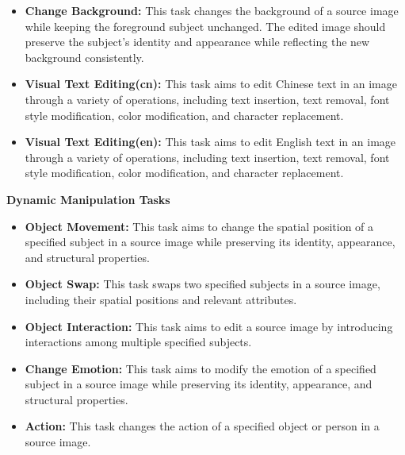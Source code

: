 \documentclass{llmxive}
\begin{document}
\begin{itemize}[leftmargin=2.2em, labelsep=0.4em, itemsep=2pt]
    \item \textbf{Change Background: } This task changes the background of a source image while keeping the foreground subject unchanged. The edited image should preserve the subject’s identity and appearance while reflecting the new background consistently.
    \item \textbf{Visual Text Editing(cn):}  This task aims to edit Chinese text in an image through a variety of operations, including text insertion, text removal, font style modification, color modification, and character replacement.
    \item \textbf{Visual Text Editing(en): } This task aims to edit English text in an image through a variety of operations, including text insertion, text removal, font style modification, color modification, and character replacement.
\end{itemize}

\textbf{Dynamic Manipulation Tasks}
\begin{itemize}[leftmargin=2.2em, labelsep=0.4em, itemsep=2pt]
    \item \textbf{Object Movement:}  This task aims to change the spatial position of a specified subject in a source image while preserving its identity, appearance, and structural properties.
    \item \textbf{Object Swap: } This task swaps two specified subjects in a source image, including their spatial positions and relevant attributes.
    \item \textbf{Object Interaction: } This task aims to edit a source image by introducing interactions among multiple specified subjects.
    \item \textbf{Change Emotion: } This task aims to modify the emotion of a specified subject in a source image while preserving its identity, appearance, and structural properties.  
    \item \textbf{Action: } This task changes the action of a specified object or person in a source image.
\end{itemize}
\end{document}
